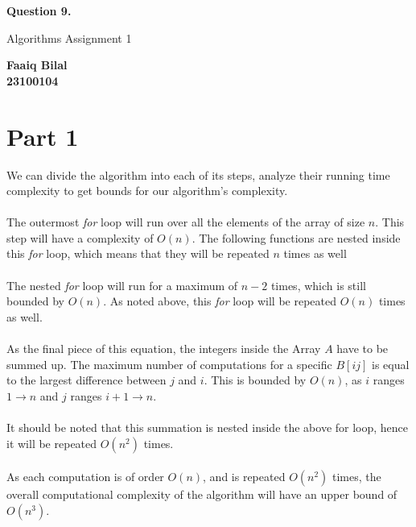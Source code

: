 \documentclass[]{article}
\begin{document}
\begin{center}
    \vspace*{1cm}

    \textbf{Question 9.}

    \vspace{0.5cm}
     Algorithms Assignment 1

    \vspace{0.15cm}

    \textbf{Faaiq Bilal} \\ 
    \textbf{23100104}
         
\end{center}

\section{Part 1}
We can divide the algorithm into each of its steps, analyze their running time complexity to get bounds for our algorithm's complexity. \\ \\
The outermost \emph{for} loop will run over all the elements of the array of size $n$. This step will have a complexity of $O(n)$. The following functions are nested inside this \emph{for} loop, which means that they will be repeated $n$ times as well \\ \\
The nested \emph{for} loop will run for a maximum of $n-2$ times, which is still bounded by $O(n)$. As noted above, this \emph{for} loop will be repeated $O(n)$ times as well. \\ \\
As the final piece of this equation, the integers inside the Array $A$ have to be summed up. The maximum number of computations for a specific $B[ij]$ is equal to the largest difference between $j$ and $i$. This is bounded by $O(n)$, as $i$ ranges $1 \rightarrow n$ and $j$ ranges $i+1 \rightarrow n$.\\ \\
It should be noted that this summation is nested inside the above for loop, hence it will be repeated $O(n^2)$ times. \\ \\
As each computation is of order $O(n)$, and is repeated $O(n^2)$ times, the overall computational complexity of the algorithm will have an upper bound of $O(n^3)$. 
\end{document}

